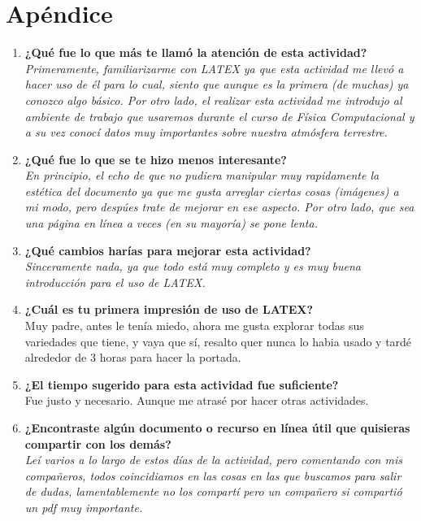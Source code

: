 \documentclass[12pt]{article}
\begin{document}
\section{Apéndice}
\begin{enumerate}
\item \textbf{¿Qué fue lo que más te llamó la atención de esta actividad?}\\
\textit{Primeramente, familiarizarme con LATEX ya que esta actividad me llevó a hacer uso de él para lo cual, siento que aunque es la primera (de muchas) ya conozco algo básico. Por otro lado, el realizar esta actividad me introdujo al ambiente de trabajo que usaremos durante el curso de Física Computacional y a su vez conocí datos muy importantes sobre nuestra atmósfera terrestre.}
\item \textbf{¿Qué fue lo que se te hizo menos interesante?}\\
\textit{En principio, el echo de que no pudiera manipular muy rapidamente la estética del documento ya que me gusta arreglar ciertas cosas (imágenes) a mi modo, pero despúes trate de mejorar en ese aspecto. Por otro lado, que sea una página en línea a veces (en su mayoría) se pone lenta. }
\item \textbf{¿Qué cambios harías para mejorar esta actividad?} \\
\textit{Sinceramente nada, ya que todo está muy completo y es muy buena introducción para el uso de LATEX.}
\item \textbf{¿Cuál es tu primera impresión de uso de LATEX?}\\
Muy padre, antes le tenía miedo, ahora me gusta explorar todas sus variedades que tiene, y vaya que sí, resalto quer nunca lo habia usado y tardé alrededor de 3 horas para hacer la portada.
\item \textbf{¿El tiempo sugerido para esta actividad fue suficiente? }\\
Fue justo y necesario. Aunque me atrasé por hacer otras actividades.
\item \textbf{¿Encontraste algún documento o recurso en línea útil que quisieras compartir con los demás? } \\
\textit{Leí varios a lo largo de estos días de la actividad, pero comentando con mis compañeros, todos coincidiamos en las cosas en las que buscamos para salir de dudas, lamentablemente no los compartí pero un compañero si compartió un pdf muy importante.}

\end{enumerate}
\end{document}
